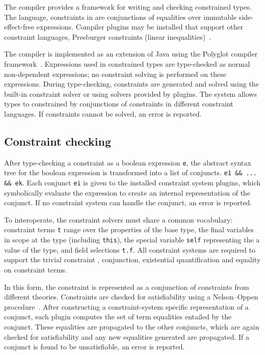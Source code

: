 %

The \Xten{} compiler provides a framework for writing and
checking constrained types.  The \Xten{} 
language, 
constraints in \Xten{} are conjunctions of equalities over immutable
side-effect-free expressions.  Compiler plugins may be installed
that support other constraint languages, Presburger
constraints (linear inequalities)~\cite{??}.

The \Xten{} compiler is implemented as an extension of
Java using the Polyglot compiler framework~\cite{ncm03}.
Expressions used in constrained
types are type-checked as normal non-dependent \Xten{} expressions;
no constraint solving is performed on these expressions.
During type-checking, constraints are generated and solved using
the built-in constraint solver or using solvers provided by
plugins.  The system allows types to constrained by conjunctions
of constraints in different constraint languages.
If constraints cannot be solved, an error is reported.

\subsection{Constraint checking}

After type-checking a constraint as a boolean expression {\tt e},
the abstract syntax tree for
the boolean expression is transformed into a list of conjuncts.
{\tt e1 \&\& ... \&\& ek}.  Each conjunct {\tt ei} is given to 
the installed constraint system plugins, which symbolically
evaluate the expression to create an internal representation of
the conjunct.  If no
constraint system can handle the conjunct, an error is reported.

To interoperate, the constraint solvers must share a common
vocabulary: constraint terms {\tt t} range over the properties of the
base type, the final variables in scope at the type (including
{\tt this}), the special variable {\tt self} representing
the a value of the type, and field selections {\tt t.f}.
All
constraint systems are required to support the trivial
constraint
\true, conjunction, existential quantification and equality on
constraint terms.


In this form, the constraint is represented as a 
conjunction of constraints from different theories.  Constraints
are checked for satisfiability using a Nelson--Oppen
procedure~\cite{nelson-oppen}.
After constructing a constraint-system specific 
representation of a conjunct, each plugin computes the set of
term equalities entailed by the conjunct.  These equalities are
propagated to the other conjuncts, which are again checked for
satisfiability and any new equalities generated are propagated.
If a conjunct is found to be unsatisfiable, an error is
reported. 

